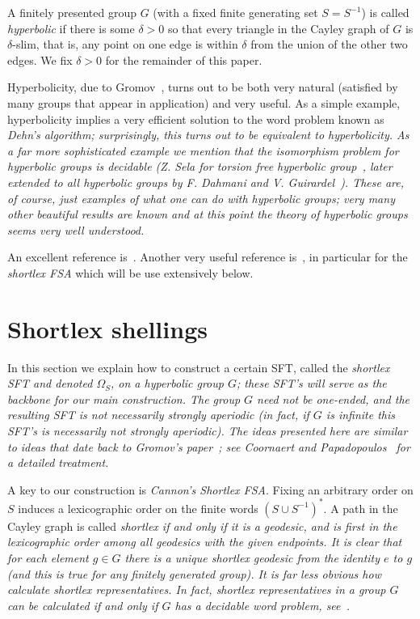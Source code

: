 \documentclass[12pt,reqno]{amsart}
\theoremstyle{plain}
\theoremstyle{definition}
\numberwithin{subcase}{case}
\theoremstyle{plain}
\theoremstyle{definition}
\begin{document}
A finitely presented group \(G\) (with a fixed finite generating set \(S = S^{-1}\)) is called {\it hyperbolic} if there is some \(\delta>0\) so that every triangle in the Cayley graph of \(G\) is \(\delta\)-slim, that is, any point on one edge is within \(\delta\) from the union of the other two edges. We fix \(\delta>0\) for the remainder of this paper.

Hyperbolicity, due to Gromov~\cite{gromov}, turns out to be both very natural (satisfied by many groups that appear in application) and very useful. As a simple example, hyperbolicity implies a very efficient solution to the word problem known as \em Dehn's algorithm\em; surprisingly, this turns out to be equivalent to hyperbolicity.  As a far more sophisticated example we mention that the isomorphism problem for hyperbolic groups is decidable (Z. Sela for torsion free hyperbolic group~\cite{MR1324134}, later extended to all hyperbolic groups by F. Dahmani and V. Guirardel~\cite{MR2795509}). These are, of course, just examples of what one can do with hyperbolic groups; very many other beautiful results are known and at this point the theory of hyperbolic groups seems very well understood.

An excellent reference is~\cite{BridsonHaefliger}. Another very useful reference is~\cite{Word_processing_in_groups}, in particular for the {\it shortlex FSA} which will be use extensively below.

\section{Shortlex shellings}
\label{section:Shortlex}


In this section we explain how to construct a certain SFT, called the \em shortlex SFT \em and denoted \(\Omega_{S}\), on a hyperbolic group \(G\); these SFT's will serve as the backbone for our main construction. The group \(G\) need not be one-ended, and the resulting SFT is not necessarily strongly aperiodic (in fact, if \(G\) is infinite this SFT's is necessarily not strongly aperiodic).  The ideas presented here are similar to ideas that date back to Gromov's paper~\cite{gromov}; see Coornaert and Papadopoulos~\cite{MR1222644,MR1878587} for a detailed treatment.


A key to our construction is {\it Cannon's Shortlex FSA}. Fixing an arbitrary order on  \(S\) induces a lexicographic order on the finite words \((S \cup S^{-1})^{*}\).  A path in the Cayley graph is called \em shortlex \em if and only if it is a geodesic, and is first in the lexicographic order among all geodesics with the given endpoints. It is clear that for each element \(g \in G\) there is a unique shortlex geodesic from the identity \(e\) to \(g\) (and this is true for any finitely generated group). It is far less obvious how calculate shortlex representatives. In fact, shortlex representatives in a group \(G\) can be calculated if and only if  \(G\) has a decidable word problem, see~\cite{book}.  
\end{document}
